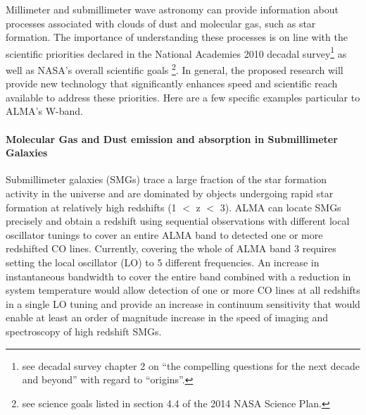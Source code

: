 Millimeter and submillimeter wave astronomy can provide information about processes associated with clouds of dust and molecular gas, such as star formation. The importance of understanding these processes is on line with the scientific priorities declared in the National Academies 2010 decadal survey\footnote{see decadal survey chapter 2 on ``the compelling questions for the next decade and beyond'' with regard to ``origins''.} as well as NASA’s overall scientific goals \footnote{see science goals listed in section 4.4 of the 2014 NASA Science Plan.}. In general, the proposed research will provide new technology that significantly enhances speed and scientific reach available to address these priorities. Here are a few specific examples particular to ALMA's W-band.


\paragraph*{Molecular Gas and Dust emission and absorption in Submillimeter Galaxies}
Submillimeter galaxies (SMGs) trace a large fraction of the star formation activity in the universe and are dominated by objects undergoing rapid star formation at relatively high redshifts (1 $<$ z $<$ 3). ALMA can locate SMGs precisely and obtain a redshift using sequential observations with different local oscillator tunings to cover an entire ALMA band to detected one or more redshifted CO lines. Currently, covering the whole of ALMA band 3 requires setting the local oscillator (LO) to 5 different frequencies. An increase in instantaneous bandwidth to cover the entire band combined with a reduction in system temperature would allow detection of one or more CO lines at all redshifts in a single LO tuning and provide an increase in continuum sensitivity that would enable at least an order of magnitude increase in the speed of imaging and spectroscopy of high redshift SMGs.

